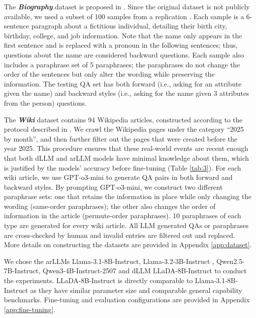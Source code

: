 The \textbf{\textit{Biography}} dataset is proposed in \cite{zhu24a,zhu24b}. Since the original dataset is not publicly available, we used a subset of 100 samples from a replication \citep{zheng2025spurious}. Each sample is a 6-sentence paragraph about a fictitious individual, detailing their birth city, birthday, college, and job information. Note that the name only appears in the first sentence and is replaced with a pronoun in the following sentences; thus, questions about the name are considered backward questions. Each sample also includes a paraphrase set of 5 paraphrases; the paraphrases do not change the order of the sentences but only alter the wording while preserving the information. The testing QA set has both forward (i.e., asking for an attribute given the name) and backward styles (i.e., asking for the name given 3 attributes from the person) questions.

The \textbf{\textit{Wiki}} dataset contains 94 Wikipedia articles, constructed according to the protocol described in \cite{pan2025memorization}. We crawl the Wikipedia pages under the category ``2025 by month'', and then further filter out the pages that were created before the year 2025. This procedure ensures that these real-world events are recent enough that both dLLM and arLLM models have minimal knowledge about them, which is justified by the models' accuracy before fine-tuning (Table \ref{tab:3}). For each wiki article, we use GPT-o3-mini to generate QA pairs in both forward and backward styles. By prompting GPT-o3-mini, we construct two different paraphrase sets: one that retains the information in place while only changing the wording (same-order paraphrases); the other also changes the order of information in the article (permute-order paraphrases). 10 paraphrases of each type are generated for every wiki article. All LLM generated QAs or paraphrases are cross-checked by human and invalid entries are filtered out and replaced. More details on constructing the datasets are provided in Appendix \ref{app:dataset}.

We chose the arLLMs Llama-3.1-8B-Instruct, Llama-3.2-3B-Instruct \citep{dubey2024llama}, Qwen2.5-7B-Instruct, Qwen3-4B-Instruct-2507 \cite{yang2025qwen3} and dLLM LLaDA-8B-Instruct \citep{llada} to conduct the experiments. LLaDA-8B-Instruct is directly comparable to Llama-3.1-8B-Instruct as they have similar parameter size and comparable general capability benchmarks. Fine-tuning and evaluation configurations are provided in Appendix \ref{app:fine-tuning}.

